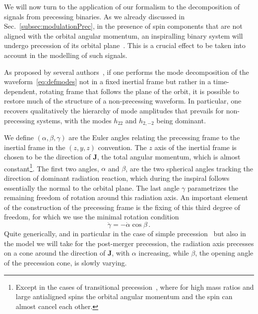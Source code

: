 \documentclass[aps,showpacs,twocolumn,
prd,superscriptaddress,nofootinbib]{revtex4-1}
\newcommand{\be}{\begin{equation}}
\newcommand{\ee}{\end{equation}}
\begin{document}
We will now turn to the application of our formalism to the decomposition of signals from precessing binaries. As we already discussed in Sec.~\ref{subsec:modulationPrec}, in the presence of spin components that are not aligned with the orbital angular momentum, an inspiralling binary system will undergo precession of its orbital plane~\cite{Apostolatos+94, Kidder95}. This is a crucial effect to be taken into account in the modelling of such signals.

As proposed by several authors~\cite{BCV03b, BCPTV05, Schmidt+10, OShaughnessy+11, Boyle+11}, if one performs the mode decomposition of the waveform~\eqref{eq:defmodes} not in a fixed inertial frame but rather in a time-dependent, rotating frame that follows the plane of the orbit, it is possible to restore much of the structure of a non-precessing waveform. In particular, one recovers qualitatively the hierarchy of mode amplitudes that prevails for non-precessing systems, with the modes $h_{22}$ and $h_{2,-2}$ being dominant.

We define $(\alpha, \beta, \gamma)$ are the Euler angles relating the precessing frame to the inertial frame in the $(z,y,z)$ convention. The $z$ axis of the inertial frame is chosen to be the direction of $\bm{J}$, the total angular momentum, which is almost constant\footnote{Except in the cases of transitional precession~\cite{Apostolatos+94}, where for high mass ratios and large antialigned spins the orbital angular momentum and the spin can almost cancel each other.}. The first two angles, $\alpha$ and $\beta$, are the two spherical angles tracking the direction of dominant radiation reaction, which during the inspiral follows essentially the normal to the orbital plane. The last angle $\gamma$ parametrizes the remaining freedom of rotation around this radiation axis. An important element of the construction of the precessing frame is the fixing of this third degree of freedom, for which we use the minimal rotation condition~\cite{Boyle+11}
\be\label{eq:gammadot}
	\dot{\gamma} = -\dot{\alpha}\cos \beta \,.
\ee
Quite generically, and in particular in the case of simple precession~\cite{Apostolatos+94, Kidder95} but also in the model we will take for the post-merger precession, the radiation axis precesses on a cone around the direction of $\bm{J}$, with $\alpha$ increasing, while $\beta$, the opening angle of the precession cone, is slowly varying.
\end{document}
